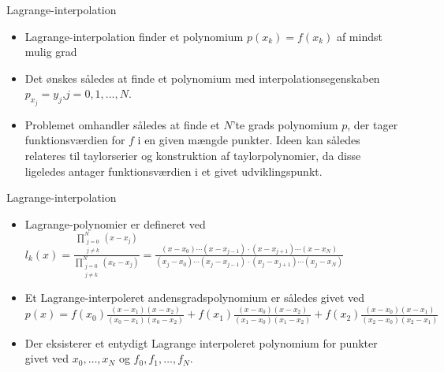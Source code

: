 
\begin{frame}{Lagrange-interpolation}
    \begin{itemize}
        \item Lagrange-interpolation finder et polynomium $p(x_k)=f(x_k)$ af mindst mulig grad %
        \item Det ønskes således at finde et polynomium med interpolationsegenskaben $p_{x_j}=y_j$,$j=0,1,\ldots,N$.

        \item Problemet omhandler således at finde et $N$'te grads polynomium $p$, der tager funktionsværdien for $f$ i en given mængde punkter. 
        Ideen kan således relateres til taylorserier og konstruktion af taylorpolynomier, da disse ligeledes antager funktionsværdien i et givet udviklingspunkt.
    \end{itemize}
\end{frame}
\begin{frame}{Lagrange-interpolation}
    \begin{itemize}
        \item Lagrange-polynomier er defineret ved \\
            $
            l_k(x)=\frac{\prod_{\substack{j=0 \\ {j \neq k}}}^{N}(x-x_j)}{\prod_{\substack{j=0 \\ {j \neq k}}}^{N}(x_k-x_j)}=\frac{(x-x_0) \cdots (x-x_{j-1}) \cdot (x-x_{j+1})\cdots(x-x_N)}{(x_j-x_0)\cdots (x_j-x_{j-1}) \cdot (x_j-x_{j+1})\cdots (x_j - x_N)}
            $
        \item Et Lagrange-interpoleret andensgradspolynomium er således givet ved $ p(x)=f(x_0)\frac{(x-x_1)(x-x_2)}{(x_0-x_1)(x_0-x_2)}+f(x_1)\frac{(x-x_0)(x-x_2)}{(x_1-x_0)(x_1-x_2)}+f(x_2)\frac{(x-x_0)(x-x_1)}{(x_2-x_0)(x_2-x_1)} $
        \item Der eksisterer et entydigt Lagrange interpoleret polynomium for punkter givet ved $x_0, \ldots, x_N$ og $f_0, f_1, \ldots , f_N$.
        
    \end{itemize}
\end{frame}

